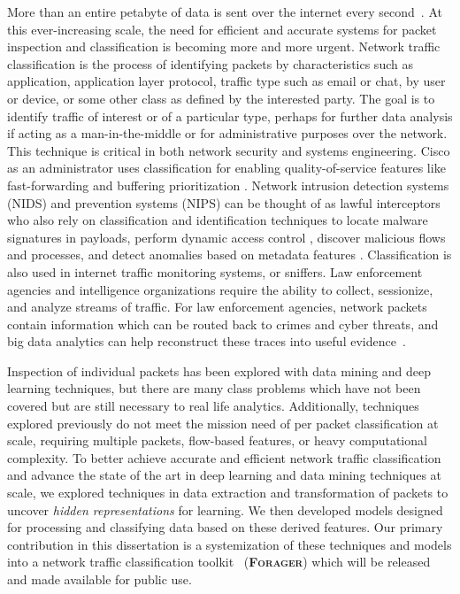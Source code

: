 More than an entire petabyte of data is sent over the internet every second~\cite{verma2022}. At this ever-increasing scale, the need for efficient and accurate systems for packet inspection and classification is becoming more and more urgent. Network traffic classification is the process of identifying packets by characteristics such as application, application layer protocol, traffic type such as email or chat, by user or device, or some other class as defined by the interested party. The goal is to identify traffic of interest or of a particular type, perhaps for further data analysis if acting as a man-in-the-middle or for administrative purposes over the network. This technique is critical in both network security and systems engineering. Cisco as an administrator uses classification for enabling quality-of-service features like fast-forwarding and buffering prioritization \cite{Cisco}. Network intrusion detection systems (NIDS) and prevention systems (NIPS) can be thought of as lawful interceptors who also rely on classification and identification techniques to locate malware signatures in payloads, perform dynamic access control \cite{DIAS2019143}, discover malicious flows and processes, and detect anomalies based on metadata features \cite{Boger}. Classification is also used in internet traffic monitoring systems, or sniffers. Law enforcement agencies and intelligence organizations require the ability to collect, sessionize, and analyze streams of traffic. For law enforcement agencies, network packets contain information which can be routed back to crimes and cyber threats, and big data analytics can help reconstruct these traces into useful evidence~\cite{actionable-intelligence}.

Inspection of individual packets has been explored with data mining and deep learning techniques, but there are many class problems which have not been covered but are still necessary to real life analytics. Additionally, techniques explored previously do not meet the mission need of per packet classification at scale, requiring multiple packets, flow-based features, or heavy computational complexity. To better achieve accurate and efficient network traffic classification and advance the state of the art in deep learning and data mining techniques at scale, we explored techniques in data extraction and transformation of packets to uncover \textit{hidden representations} for learning. We then developed models designed for processing and classifying data based on these derived features. Our primary contribution in this dissertation is a systemization of these techniques and models into a network traffic classification toolkit ~\textsc{(\textbf{Forager})} which will be released and made available for public use.

